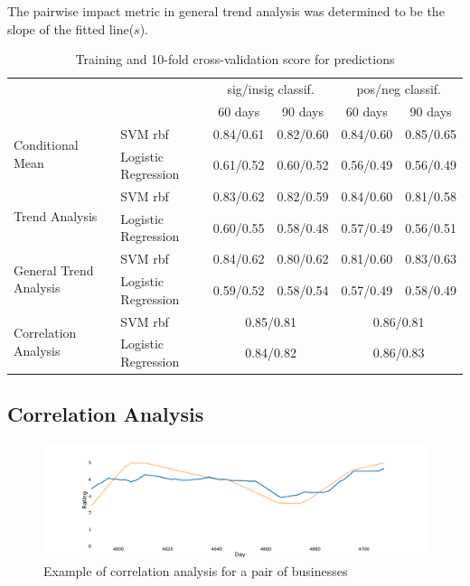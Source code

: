 \documentclass{vldb}
\begin{document}
The pairwise impact metric in general trend analysis was determined to be the slope of the fitted line($s$). 

\begin{table}[ht!]
\centering
\begin{tabular}{@{}llrrrr@{}}
\toprule
                                                              &                     & \multicolumn{2}{c}{sig/insig classif.} & \multicolumn{2}{c}{pos/neg classif.} \\ 
\cmidrule(r){3-4}
\cmidrule(r){5-6}
                                                              &                     & \multicolumn{1}{c}{60 days} & \multicolumn{1}{c}{90 days} & \multicolumn{1}{c}{60 days} & \multicolumn{1}{c}{90 days} \\ \midrule
\multirow{2}{*}{Conditional Mean}  & SVM rbf             &   0.84/0.61   &  0.82/0.60  & 0.84/0.60 &  0.85/0.65  \\
                                        & Logistic Regression & 0.61/0.52  & 0.60/0.52 &  0.56/0.49   &  0.56/0.49   \\ \midrule
\multirow{2}{*}{Trend Analysis}       & SVM rbf             & 0.83/0.62    &  0.82/0.59 & 0.84/0.60 & 0.81/0.58   \\
                                        & Logistic Regression &  0.60/0.55   & 0.58/0.48 &  0.57/0.49  &  0.56/0.51   \\ \midrule
\multirow{2}{*}{General Trend Analysis} & SVM rbf             & 0.84/0.62 & 0.80/0.62 &  0.81/0.60 &  0.83/0.63  \\
                                       & Logistic Regression &  0.59/0.52  & 0.58/0.54  &   0.57/0.49  &   0.58/0.49       \\ \midrule
\multirow{2}{*}{Correlation Analysis}   & SVM rbf             & \multicolumn{2}{c}{0.85/0.81}  & \multicolumn{2}{c}{0.86/0.81} \\
                                        & Logistic Regression & \multicolumn{2}{c}{0.84/0.82}  & \multicolumn{2}{c}{0.86/0.83} \\
\bottomrule
\end{tabular}
\caption{Training and 10-fold cross-validation score for predictions}
\label{tab:results}
\end{table}

\subsection*{Correlation Analysis}
\begin{figure}[h]
\centering
\includegraphics[width=\columnwidth]{corr.pdf}
\caption{Example of correlation analysis for a pair of businesses}
\end{figure}
\end{document}
